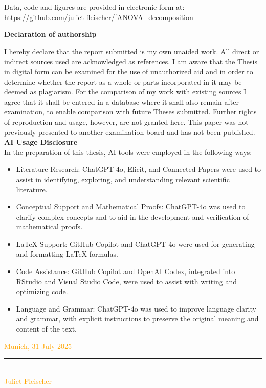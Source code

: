 \documentclass[12pt]{article}
\begin{document}
Data, code and figures are provided in electronic form at:\\
\url{https://github.com/juliet-fleischer/fANOVA_decomposition}


\newpage
    



\Large
\noindent
\textbf{Declaration of authorship} 
\vspace{0.5cm}
\noindent
\normalsize

I hereby declare that the report submitted is my own unaided work. All direct 
or indirect sources used are acknowledged as references. I am aware that the 
Thesis in digital form can be examined for the use of unauthorized aid and in 
order to determine whether the report as a whole or parts incorporated in it may 
be deemed as plagiarism. For the comparison of my work with existing sources I 
agree that it shall be entered in a database where it shall also remain after 
examination, to enable comparison with future Theses submitted. Further rights 
of reproduction and usage, however, are not granted here. This paper was not 
previously presented to another examination board and has not been published.
\\
\textbf{AI Usage Disclosure}\\
In the preparation of this thesis, AI tools were employed in the following ways:
\begin{itemize}
    \item Literature Research: ChatGPT-4o, Elicit, and Connected Papers were used to assist in identifying, exploring, and understanding relevant scientific literature.
    \item Conceptual Support and Mathematical Proofs: ChatGPT-4o was used to clarify complex concepts and to aid in the development and verification of mathematical proofs.
    \item \LaTeX{} Support: GitHub Copilot and ChatGPT-4o were used for generating and formatting \LaTeX{} formulas.
    \item Code Assistance: GitHub Copilot and OpenAI Codex, integrated into RStudio and Visual Studio Code, were used to assist with writing and optimizing code.
    \item Language and Grammar: ChatGPT-4o was used to improve language clarity and grammar, with explicit instructions to preserve the original meaning and content of the text.
\end{itemize}


\vspace{1cm}
\textcolor{orange}{Munich, 31 July 2025} \\

\vspace{3cm}

\noindent\rule{0.5\textwidth}{0.4pt} \\

\textcolor{orange}{Juliet Fleischer}

\end{document}
